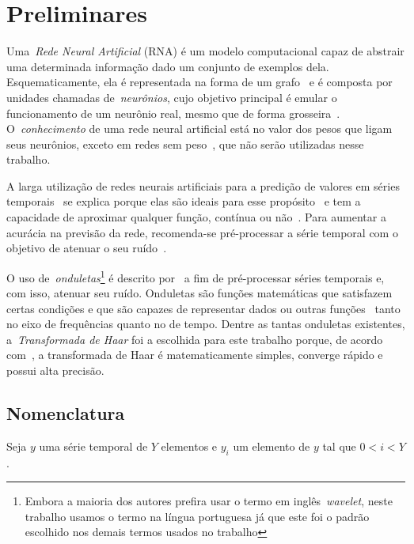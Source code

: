 \chapter{Preliminares}
\label{Cap:Preliminares}

Uma~\emph{Rede Neural Artificial} (RNA) é um modelo computacional capaz de abstrair uma determinada informação dado um conjunto de exemplos dela. Esquematicamente, ela é representada na forma de um grafo~\cite{LIVRO:1996.9780201539219} e é composta por unidades chamadas de~\emph{neurônios}, cujo objetivo principal é emular o funcionamento de um neurônio real, mesmo que de forma grosseira~\cite{LIVRO:2003.9780203451519}. O~\emph{conhecimento} de uma rede neural artificial está no valor dos pesos que ligam seus neurônios, exceto em redes sem peso~\cite{ARTIGO:10.1108, ARTIGO:1959.1460326}, que não serão utilizadas nesse trabalho.

A larga utilização de redes neurais artificiais para a predição de valores em séries temporais~\cite{ARTIGO:1992.253659, ARTIGO:1992.253669} se explica porque elas são ideais para esse propósito~\cite{ARTIGO:1992.153489} e tem a capacidade de aproximar qualquer função, contínua ou não~\cite{LIVRO:2009.9788591020805}. Para aumentar a acurácia na previsão da rede, recomenda-se pré-processar a série temporal com o objetivo de atenuar o seu ruído~\cite{ARTIGO:2010.5345722}.

O uso de~\emph{onduletas}\footnote{Embora a maioria dos autores prefira usar o termo em inglês~\emph{wavelet}, neste trabalho usamos o termo na língua portuguesa já que este foi o padrão escolhido nos demais termos usados no trabalho} é descrito por~\cite{ARTIGO:1992.165591, ARTIGO:2001.938397} a fim de pré-processar séries temporais e, com isso, atenuar seu ruído. Onduletas são funções matemáticas que satisfazem certas condições e que são capazes de representar dados ou outras funções~\cite{ARTICLE:1995.388960} tanto no eixo de frequências quanto no de tempo. Dentre as tantas onduletas existentes, a~\emph{Transformada de Haar} foi a escolhida para este trabalho porque, de acordo com~\cite{ARTIGO:2016.Reddy2016}, a transformada de Haar é matematicamente simples, converge rápido e possui alta precisão.

\section{Nomenclatura}

Seja $y$ uma série temporal de $Y$ elementos e $y_i$ um elemento de $y$ tal que $0 < i < Y$. 

